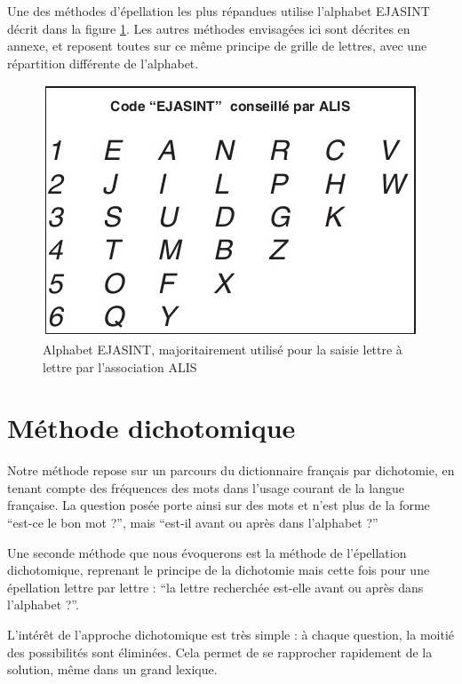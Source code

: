 \documentclass[twoside,twocolumn]{article}
\begin{document}
Une des méthodes d'épellation les plus répandues utilise l'alphabet EJASINT décrit dans la figure \ref{ejasint}. Les autres méthodes envisagées ici sont décrites en annexe, et reposent toutes sur ce même principe de grille de lettres, avec une répartition différente de l'alphabet.
\begin{center}
\begin{figure}
  \includegraphics[scale=0.45]{ejasint.jpg}
  \caption{Alphabet EJASINT, majoritairement utilisé pour la saisie lettre à lettre par l'association ALIS}
  \label{ejasint}
\end{figure}
\end{center}


\section{Méthode dichotomique}

Notre méthode repose sur un parcours du dictionnaire français par dichotomie, en tenant compte des fréquences des mots dans l'usage courant de la langue française. La question posée porte ainsi sur des mots et n'est plus de la forme ``est-ce le bon mot ?'', mais ``est-il avant ou après dans l'alphabet ?''

Une seconde méthode que nous évoquerons est la méthode de l'épellation dichotomique, reprenant le principe de la dichotomie mais cette fois pour une épellation lettre par lettre : ``la lettre recherchée est-elle avant ou après dans l'alphabet ?''.

L'intérêt de l'approche dichotomique est très simple : à chaque question, la moitié des possibilités sont éliminées. Cela permet de se rapprocher rapidement de la solution, même dans un grand lexique.
\end{document}
